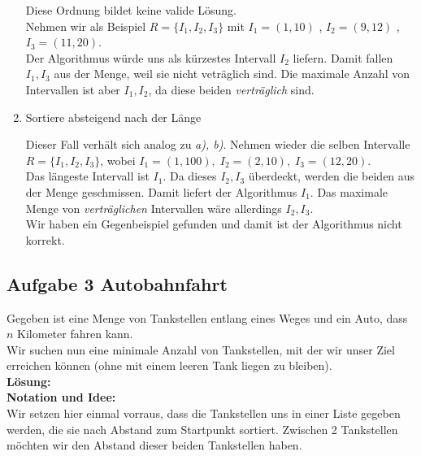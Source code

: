 \documentclass[11pt,a4paper,ngerman]{article}
\begin{document}
\begin{enumerate}[\bfseries (a)]
Diese Ordnung bildet keine valide Lösung.\\
Nehmen wir als Beispiel $R = \{ I_1 , I_2 , I_3\}$ mit $I_1 = (1,10)$ , $I_2 = (9,12)$ , $I_3 = (11,20)$.\\

Der Algorithmus würde uns als kürzestes Intervall $I_2$ liefern. Damit fallen $I_1, I_3$ aus der Menge, weil sie nicht veträglich sind. Die maximale Anzahl von Intervallen ist aber $I_1, I_2$, da diese beiden \emph{verträglich} sind.


\item Sortiere absteigend nach der Länge

Dieser Fall verhält sich analog zu \emph{a), b)}. Nehmen wieder die selben Intervalle $R = \{ I_1, I_2, I_3 \}$, wobei $I_1 = (1, 100), \; I_2 = (2, 10), \; I_3 = (12 , 20)$.\\

Das längeste Intervall ist $I_1$. Da dieses $I_2, I_3$ überdeckt, werden die beiden aus der Menge geschmissen. Damit liefert der Algorithmus $I_1$. Das maximale Menge von \emph{verträglichen} Intervallen wäre allerdings $I_2, I_3$.\\

Wir haben ein Gegenbeispiel gefunden und damit ist der Algorithmus nicht korrekt.

\end{enumerate}

\pagebreak

\subsection*{Aufgabe 3 \mdseries Autobahnfahrt}

Gegeben ist eine Menge von Tankstellen entlang eines Weges und ein Auto, dass $n$ Kilometer fahren kann.\\
Wir suchen nun eine minimale Anzahl von Tankstellen, mit der wir unser Ziel erreichen können (ohne mit einem leeren Tank liegen zu bleiben).\\

\textbf{Lösung:}\\

\textbf{Notation und Idee:}\\
Wir setzen hier einmal vorraus, dass die Tankstellen uns in einer Liste gegeben werden, die sie nach Abstand zum Startpunkt sortiert. Zwischen 2 Tankstellen möchten wir den Abstand dieser beiden Tankstellen haben.\\
\end{document}
